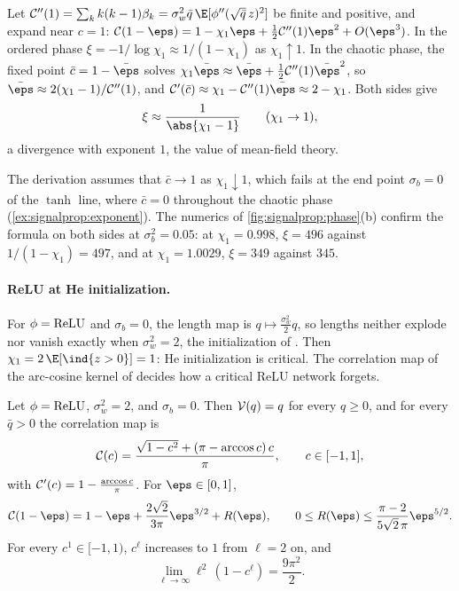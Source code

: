 \begin{refsection}
\begin{heuristic}
Let $\signalpropC''(1)=\sum_kk(k-1)\beta_k=\sigma_w^2\bar q\,\E[\phi''(\sqrt{\bar q}\,z)^2]$ be finite and positive, and expand near $c=1$: $\signalpropC(1-\eps)=1-\chi_1\eps+\frac12\signalpropC''(1)\eps^2+O(\eps^3)$. In the ordered phase $\xi=-1/\log\chi_1\approx1/(1-\chi_1)$ as $\chi_1\uparrow1$. In the chaotic phase, the fixed point $\bar c=1-\bar\eps$ solves $\chi_1\bar\eps\approx\bar\eps+\frac12\signalpropC''(1)\bar\eps^2$, so $\bar\eps\approx2(\chi_1-1)/\signalpropC''(1)$, and $\signalpropC'(\bar c)\approx\chi_1-\signalpropC''(1)\bar\eps\approx2-\chi_1$. Both sides give
\[
  \xi\approx\frac1{\abs{\chi_1-1}}\qquad(\chi_1\to1),
\]
a divergence with exponent $1$, the value of mean-field theory.\qedhere
\end{heuristic}

The derivation assumes that $\bar c\to1$ as $\chi_1\downarrow1$, which fails at the end point $\sigma_b=0$ of the $\tanh$ line, where $\bar c=0$ throughout the chaotic phase (\cref{ex:signalprop:exponent}). The numerics of \cref{fig:signalprop:phase}(b) confirm the formula on both sides at $\sigma_b^2=0.05$: at $\chi_1=0.998$, $\xi=496$ against $1/(1-\chi_1)=497$, and at $\chi_1=1.0029$, $\xi=349$ against $345$.

\paragraph{ReLU at He initialization.} For $\phi=\operatorname{ReLU}$ and $\sigma_b=0$, the length map is $q\mapsto\frac{\sigma_w^2}2q$, so lengths neither explode nor vanish exactly when $\sigma_w^2=2$, the initialization of \textcite{HeEtAl2015}. Then $\chi_1=2\,\E[\ind\{z>0\}]=1$: He initialization is critical. The correlation map of the arc-cosine kernel of \textcite{ChoSaul2009} decides how a critical ReLU network forgets.

\begin{theorem}\label{thm:signalprop:relu}
Let $\phi=\operatorname{ReLU}$, $\sigma_w^2=2$, and $\sigma_b=0$. Then $\mathcal{V}(q)=q$ for every $q\ge0$, and for every $\bar q>0$ the correlation map is
\begin{equation}\label{eq:signalprop:arccos}
  \mathcal{C}(c)=\frac{\sqrt{1-c^2}+(\pi-\arccos c)\,c}{\pi},\qquad c\in[-1,1],
\end{equation}
with $\mathcal{C}'(c)=1-\frac{\arccos c}\pi$. For $\eps\in[0,1]$,
\begin{equation}\label{eq:signalprop:relu-expansion}
  \signalpropC(1-\eps)=1-\eps+\frac{2\sqrt2}{3\pi}\eps^{3/2}+R(\eps),\qquad 0\le R(\eps)\le\frac{\pi-2}{5\sqrt2\,\pi}\eps^{5/2}.
\end{equation}
For every $c^1\in[-1,1)$, $c^\ell$ increases to $1$ from $\ell=2$ on, and
\begin{equation}\label{eq:signalprop:ninepi}
  \lim_{\ell\to\infty}\ell^2\,(1-c^\ell)=\frac{9\pi^2}2 .
\end{equation}
\end{theorem}


\end{refsection}

